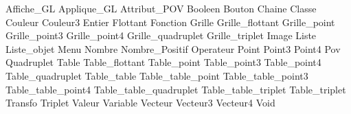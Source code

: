 Affiche\_GL
Applique\_GL
Attribut\_POV
Booleen
Bouton
Chaine
Classe
Couleur
Couleur3
Entier
Flottant
Fonction
Grille
Grille\_flottant
Grille\_point
Grille\_point3
Grille\_point4
Grille\_quadruplet
Grille\_triplet
Image
Liste
Liste\_objet
Menu
Nombre
Nombre\_Positif
Operateur
Point
Point3
Point4
Pov
Quadruplet
Table
Table\_flottant
Table\_point
Table\_point3
Table\_point4
Table\_quadruplet
Table\_table
Table\_table\_point
Table\_table\_point3
Table\_table\_point4
Table\_table\_quadruplet
Table\_table\_triplet
Table\_triplet
Transfo
Triplet
Valeur
Variable
Vecteur
Vecteur3
Vecteur4
Void
